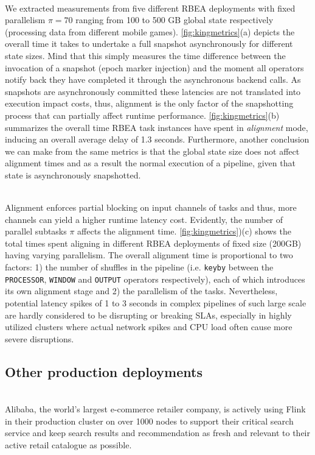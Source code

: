  \\
We extracted measurements from five different RBEA deployments with fixed parallelism $\pi = 70$ ranging from 100 to 500 GB global state respectively (processing data from different mobile games). \autoref{fig:kingmetrics}(a) depicts the overall time it takes to undertake a full snapshot asynchronously for different state sizes. Mind that this simply measures the time difference between the invocation of a snapshot (epoch marker injection) and the moment all operators notify back they have completed it through the asynchronous backend calls. As snapshots are asynchronously committed these latencies are not translated into execution impact costs, thus, alignment is the only factor of the snapshotting process that can partially affect runtime performance. \autoref{fig:kingmetrics}(b) summarizes the overall time RBEA task instances have spent in \emph{alignment} mode, inducing an overall average delay of 1.3 seconds. Furthermore, another conclusion we can make from the same metrics is that the global state size does not affect alignment times and as a result the normal execution of a pipeline, given that state is asynchronously snapshotted.

 \\
Alignment enforces partial blocking  on input channels of tasks and thus, more channels can yield a higher runtime latency cost. Evidently, the number of parallel subtasks $\pi$ affects the alignment time. \autoref{fig:kingmetrics})(c) shows the total times spent aligning in different RBEA deployments of fixed size (200GB) having varying parallelism. The overall alignment time is proportional to two factors: 1) the number of shuffles in the pipeline (i.e. \texttt{keyby} between the \texttt{PROCESSOR}, \texttt{WINDOW} and \texttt{OUTPUT} operators respectively), each of which introduces its own alignment stage and 2) the parallelism of the tasks. Nevertheless, potential latency spikes of 1 to 3 seconds in complex pipelines of such large scale are hardly considered to be disrupting or breaking SLAs, especially in highly utilized clusters where actual network spikes and CPU load often cause more severe disruptions.

\subsection{Other production deployments}
 \\
{Alibaba}, the world's largest e-commerce retailer company, is actively using Flink in their production cluster on over 1000 nodes to support their critical search service \cite{CUSTOM:web/alibaba} and keep search results and recommendation as fresh and relevant to their active retail catalogue as possible.

